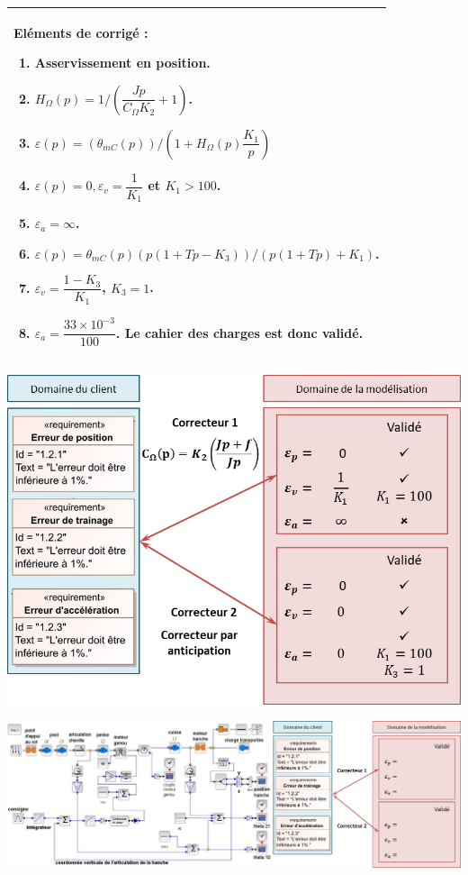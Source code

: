 \documentclass[10pt,fleqn]{article} %
\begin{document}
\begin{multicols}{2}
\footnotesize
\begin{tabular}{|p{\linewidth}|}
\hline
Eléments de corrigé :
\begin{enumerate}
\item Asservissement en position.
\item $H_{\Omega}(p)= {1}/\left(\dfrac{Jp}{C_{\Omega} K_2}+1 \right) $.
\item $\varepsilon(p)=\left( \theta_{mC}(p)\right)/\left( 1+H_{\Omega}(p) \dfrac{K_1}{p}\right)$
\item $\varepsilon(p)= 0, \varepsilon_v = \dfrac{1}{K_1}$   et $K_1 >100$.
\item $\varepsilon_a = \infty$.
\item $\varepsilon(p) = \theta_{mC}(p)\left(p\left( 1+Tp-K_3\right) \right)/\left(p \left( 1+Tp\right)+K_1\right) $.
\item $\varepsilon_v =\dfrac{1-K_3}{K_1}$, $K_3=1$.
\item $\varepsilon_a = \dfrac{33\times 10^{-3}}{100} $. Le cahier des charges est donc validé. 
\end{enumerate} \\
\hline
\end{tabular}
\normalsize
\end{multicols}
\ifprof
\begin{center}
\includegraphics[width=.8\linewidth]{images/cor_02}
\end{center}

\else
\begin{center}
\includegraphics[width=\linewidth]{images/fig_10}
\end{center}
\fi

\end{document}
